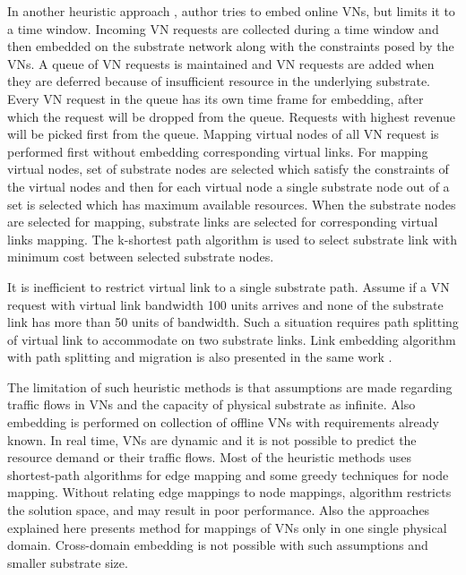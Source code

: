 \documentclass[article,dr=phil,type=msc ,colorback,accentcolor=tud4b]{tudthesis}
\begin{document}
In another heuristic approach \cite{h2}, author tries to embed online VNs, but limits it to a time window. Incoming VN requests are collected during a time window and then embedded on the substrate network along with the constraints posed by the VNs. A queue of VN requests is maintained and VN requests are added when they are deferred because of insufficient resource in the underlying substrate. Every VN request in the queue has its own time frame for embedding, after which the request will be dropped from the queue.  Requests with highest revenue will be picked first from the queue. Mapping virtual nodes of all VN request is performed first without embedding corresponding virtual links. For mapping virtual nodes, set of substrate nodes are selected which satisfy the constraints of the virtual nodes and then for each virtual node a single substrate node out of a set is selected which has maximum available resources.  When the substrate nodes are selected for mapping, substrate links are selected for corresponding virtual links mapping.  The k-shortest path algorithm is used to select substrate link with minimum cost between selected substrate nodes. \newline

It is inefficient to restrict virtual link to a single substrate path. Assume if a VN request with virtual link bandwidth 100 units arrives and none of the substrate link has more than 50 units of bandwidth. Such a situation requires path splitting of virtual link to accommodate on two substrate links. Link embedding algorithm with path splitting and migration is also presented in the same work \cite{h2}. \newline

The limitation of such heuristic methods is that assumptions are made regarding traffic flows in VNs and the capacity of physical substrate as infinite. Also embedding is performed on collection of offline VNs with requirements already known. In real time, VNs are dynamic and it is not possible to predict the resource demand or their traffic flows. Most of the heuristic methods \cite{h1, h2, h3, h4} uses shortest-path algorithms for edge mapping and some greedy techniques for node mapping. Without relating edge mappings to node mappings, algorithm restricts the solution space, and may result in poor performance. Also the approaches explained here presents method for mappings of VNs only in one single physical domain. Cross-domain embedding is not possible with such assumptions and smaller substrate size. \newline
\end{document}
